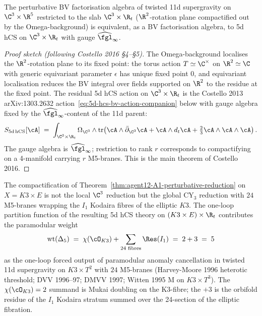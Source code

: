 \begin{theorem}
\label{thm:agent12-A1-perturbative-reduction}
The perturbative BV factorisation algebra of twisted 11d supergravity
on $\C^3 \times \R^5$ restricted to the slab $\C^3 \times \R_t$
($\R^2$-rotation plane compactified out by the Omega-background) is
equivalent, as a BV factorisation algebra, to 5d hCS on
$\C^3 \times \R_t$ with gauge $\widehat{\fgl}_\infty$.
\end{theorem}

\begin{proof}[Proof sketch (following Costello 2016 \S4--\S5)]
The Omega-background localises the $\R^2$-rotation plane to its fixed
point: the torus action $T \simeq \C^\times$ on $\R^2 \simeq \C$ with
generic equivariant parameter $\epsilon$ has unique fixed point $0$,
and equivariant localisation reduces the BV integral over fields
supported on $\R^2$ to the residue at the fixed point. The residual
5d hCS action on $\C^3 \times \R_t$ is the Costello 2013
arXiv:1303.2632 action~\eqref{eq:5d-hcs-bv-action-companion} below
with gauge algebra fixed by the $\widehat{\fgl}_\infty$-content of
the 11d parent:
\[
 S_{5\mathrm{d\,hCS}}[\cA]
 \;=\;
 \int_{\C^3 \times \R_t} \Omega_{\C^3}
 \wedge \operatorname{tr}\!\left(
 \cA \wedge \bar\partial_{\C^3} \cA
 + \cA \wedge d_t \cA
 + \tfrac{2}{3} \cA \wedge \cA \wedge \cA
 \right).
\]
The gauge algebra is $\widehat{\fgl}_\infty$; restriction to rank $r$
corresponds to compactifying on a 4-manifold carrying $r$ M5-branes.
This is the main theorem of Costello 2016.
\end{proof}

\begin{remark}
\label{rem:agent12-one-loop-paramodular-5}
The compactification of Theorem~\ref{thm:agent12-A1-perturbative-reduction}
on $X = K3 \times E$ is not the local $\C^3$ reduction but the global
CY$_3$ reduction with $24$ M5-branes wrapping the $I_1$ Kodaira fibres
of the elliptic $K3$. The one-loop partition function of the resulting
5d hCS theory on $(K3 \times E) \times \R_t$ contributes the
paramodular weight
\[
 \mathrm{wt}(\Delta_5)
 \;=\;
 \chi(\cO_{K3}) + \sum_{\text{24 fibres}} \Res(I_1)
 \;=\;
 2 + 3
 \;=\;
 5
\]
as the one-loop forced output of paramodular anomaly cancellation in
twisted 11d supergravity on $K3 \times T^2$ with $24$ M5-branes
(Harvey-Moore 1996 heterotic threshold; DVV 1996--97; DMVV 1997;
Witten 1995 M on $K3 \times T^3$). The $\chi(\cO_{K3}) = 2$ summand
is Mukai doubling on the K3-fibre; the $+3$ is the orbifold residue
of the $I_1$ Kodaira stratum summed over the 24-section of the
elliptic fibration.
\end{remark}

